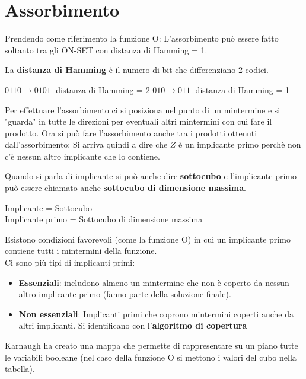 \documentclass[a4paper]{article}
\theoremstyle{break}
\theoremstyle{break}
\theoremstyle{break}
\theoremstyle{break}
\begin{document}
\section{Assorbimento}
Prendendo come riferimento la funzione O:
\label{D8}
L'assorbimento può essere fatto soltanto tra gli ON-SET con distanza di
Hamming = 1.
\begin{definition}
   La \textbf{distanza di Hamming} è il numero di bit che differenziano 2 codici. 
   \begin{center}
    \( 0110 \to 0101\; \) distanza di Hamming = 2 
    \( 010 \to 011\; \) distanza di Hamming = 1 
   \end{center}
\end{definition}
Per effettuare l'assorbimento ci si posiziona nel punto di un mintermine e si
"guarda" in tutte le direzioni per eventuali altri mintermini con cui fare il
prodotto.
\label{D9}
Ora si può fare l'assorbimento anche tra i prodotti ottenuti dall'assorbimento:
\label{D10}
Si arriva quindi a dire che \( Z \) è un implicante primo perchè non c'è nessun
altro implicante che lo contiene.
\begin{define}
   Quando si parla di implicante si può anche dire \textbf{sottocubo} e
   l'implicante primo può essere chiamato anche \textbf{sottocubo di dimensione
   massima}.
   \begin{center}
       Implicante = Sottocubo\\
       Implicante primo = Sottocubo di dimensione massima
   \end{center}
\end{define}
Esistono condizioni favorevoli (come la funzione O) in cui un implicante primo
contiene tutti i mintermini della funzione.\\
Ci sono più tipi di implicanti primi:
\begin{itemize}
    \item \textbf{Essenziali}: includono almeno un mintermine che non è coperto da nessun
        altro implicante primo (fanno parte della soluzione finale).
    \item \textbf{Non essenziali}:  Implicanti primi che coprono mintermini
        coperti anche da altri implicanti.
        Si identificano con l'\textbf{algoritmo di copertura}
\end{itemize}
Karnaugh ha creato una mappa che permette di rappresentare su un piano tutte
le variabili booleane (nel caso della funzione O si mettono i valori del cubo
nella tabella).
\label{D11}

\label{D12} %
\end{document}
